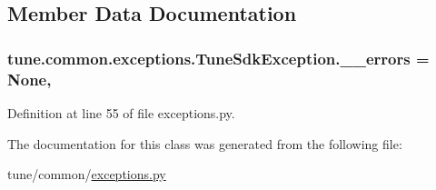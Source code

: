 \subsection{Member Data Documentation}
\hypertarget{classtune_1_1common_1_1exceptions_1_1TuneSdkException_a17770d669ae88aeb8aab99d01bf900c8}{
\subsubsection[{\-\_\-\-\_\-errors}]{\setlength{\rightskip}{0pt plus 5cm}tune.\-common.\-exceptions.\-Tune\-Sdk\-Exception.\-\_\-\-\_\-errors = None\hspace{0.3cm}{\ttfamily [static]}, {\ttfamily [private]}}}\label{classtune_1_1common_1_1exceptions_1_1TuneSdkException_a17770d669ae88aeb8aab99d01bf900c8}


Definition at line 55 of file exceptions.\-py.



The documentation for this class was generated from the following file\-:\begin{DoxyCompactItemize}
\item 
tune/common/\hyperlink{exceptions_8py}{exceptions.\-py}\end{DoxyCompactItemize}
